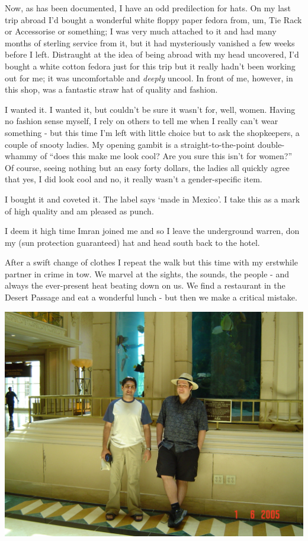 \documentclass[a5paper,titlepage,11pt]{book}
\begin{document}
Now, as has been documented, I have an odd predilection for hats. On my last trip abroad I'd bought a wonderful white floppy paper fedora from, um, Tie Rack or Accessorise or something; I was very much attached to it and had many months of sterling service from it, but it had mysteriously vanished a few weeks before I left. Distraught at the idea of being abroad with my head uncovered, I'd bought a white cotton fedora just for this trip but it really hadn't been working out for me; it was uncomfortable and \emph{deeply} uncool. In front of me, however, in this shop, was a fantastic straw hat of quality and fashion.

I wanted it. I wanted it, but couldn't be sure it wasn't for, well, women. Having no fashion sense myself, I rely on others to tell me when I really can't wear something - but this time I'm left with little choice but to ask the shopkeepers, a couple of snooty ladies. My opening gambit is a straight-to-the-point double-whammy of ``does this make me look cool?  Are you sure this isn't for women?''  Of course, seeing nothing but an easy forty dollars, the ladies all quickly agree that yes, I did look cool and no, it really wasn't a gender-specific item.

I bought it and coveted it. The label says `made in Mexico'. I take this as a mark of high quality and am pleased as punch.

I deem it high time Imran joined me and so I leave the underground warren, don my (sun protection guaranteed) hat and head south back to the hotel.

After a swift change of clothes I repeat the walk but this time with my erstwhile partner in crime in tow. We marvel at the sights, the sounds, the people - and always the ever-present heat beating down on us. We find a restaurant in the Desert Passage and eat a wonderful lunch - but then we make a critical mistake.

\begin{center}\includegraphics[width=\textwidth]{gfx/DSC00685}\end{center}
\end{document}
